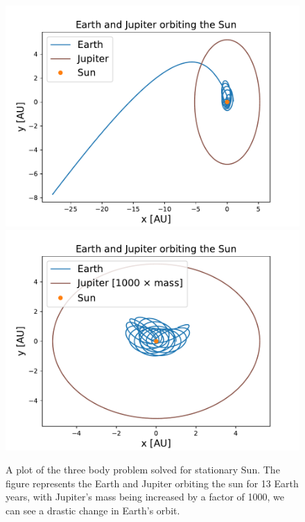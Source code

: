 \documentclass{emulateapj}
\begin{document}
\begin{figure}[H]
{{\includegraphics[scale=0.53]{3e-1000m-n1e3-t14.pdf}}
}\qquad
{{\includegraphics[scale=0.53]{3e-1000m-n1e6-t13.pdf}}
}\qquad
\caption{A plot of the three body problem solved for stationary Sun. The figure represents the Earth and Jupiter orbiting the sun for 13 Earth years, with Jupiter's mass being increased by a factor of 1000, we can see a drastic change in Earth's orbit.}
\label{fig:Jupiter1000}
\end{figure}
\end{document}
